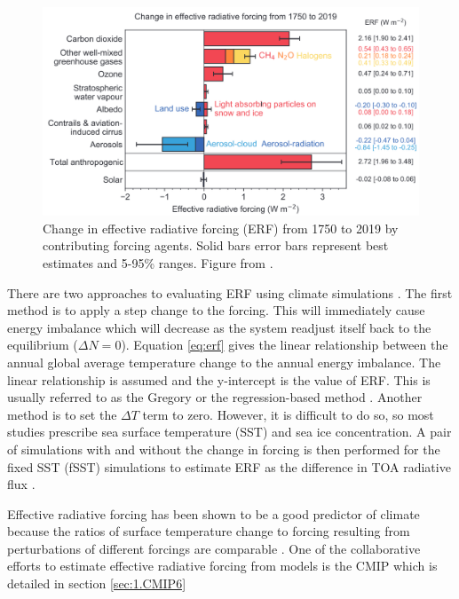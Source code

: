 \begin{figure}
    \centering
    \includegraphics[width=6in]{Chapter1/figs/02_ERF.png}
    \caption[Effective radiative forcing (ERF) from 1750 to 2019]{Change in effective radiative forcing (ERF) from 1750 to 2019 by contributing forcing agents. Solid bars error bars represent best estimates and 5-95\% ranges. Figure from \citet{forsterEarthEnergyBudget2021}.}
    \label{fig:1.ERF}
\end{figure}

There are two approaches to evaluating ERF using climate simulations \citep[e.g.][]{gregoryNewMethodDiagnosing2004, oconnorAssessmentPreindustrialPresentday2021}.  The first method is to apply a step change to the forcing. This will immediately cause energy imbalance which will decrease as the system readjust itself back to the equilibrium ($\Delta N=0$). Equation \ref{eq:erf} gives the linear relationship between the annual global average temperature change to the annual energy imbalance. The linear relationship is assumed and the y-intercept is the value of ERF. This is usually referred to as the Gregory or the regression-based method \citep{gregoryNewMethodDiagnosing2004}. Another method is to set the $\Delta T$ term to zero. However, it is difficult to do so, so most studies prescribe sea surface temperature (SST) and sea ice concentration. A pair of simulations with and without the change in forcing is then performed for the fixed SST (fSST) simulations to estimate ERF as the difference in TOA radiative flux \citep{myhreNewEstimatesRadiative1998}. 


Effective radiative forcing has been shown to be a good predictor of climate because the ratios of surface temperature change to forcing resulting from perturbations of different forcings are comparable \citep{myhreAnthropogenicNaturalRadiative2013, boucherCloudsAerosols2014}. One of the collaborative efforts to estimate effective radiative forcing from models is the CMIP which is detailed in section \ref{sec:1.CMIP6}


